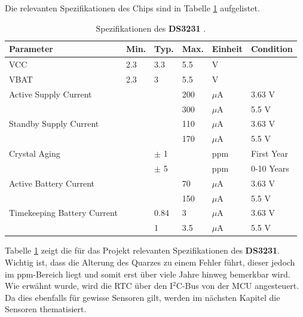 \newpage
Die relevanten Spezifikationen des Chips sind in Tabelle \ref{tab:DS3231} aufgelistet.\\

\begin{table}[h]
\begin{tabular}{llllll}
\hline 
\textbf{Parameter} & \textbf{Min.} & \textbf{Typ.} & \textbf{Max.} & \textbf{Einheit} & \textbf{Condition} \\ 
\hline 
VCC & 2.3 & 3.3 & 5.5 & V &  \\ 
VBAT & 2.3 & 3 & 5.5 & V &  \\ 
Active Supply Current &  &  & 200 & $\mu$A & 3.63 V \\ 
 &  &  & 300 & $\mu$A & 5.5 V \\ 
Standby Supply Current &  & & 110 & $\mu$A & 3.63 V \\ 
 &  &  & 170 & $\mu$A & 5.5 V \\ 
Crystal Aging &  & $\pm$ 1 &  & ppm & First Year \\ 
 &  & $\pm$ 5 &  & ppm & 0-10 Years \\ 
Active Battery Current &  &  & 70 & $\mu$A & 3.63 V \\ 
 &  &  & 150 & $\mu$A & 5.5 V \\ 
Timekeeping Battery Current &  & 0.84 & 3 & $\mu$A & 3.63 V \\ 
 &  & 1 & 3.5 & $\mu$A & 5.5 V \\ 
\hline 
\end{tabular} 
\caption{Spezifikationen des \textbf{DS3231} \cite{DS3231DS}.}
\label{tab:DS3231}
\end{table}

Tabelle \ref{tab:DS3231} zeigt die für das Projekt relevanten Spezifikationen des \textbf{DS3231}. Wichtig ist, dass die Alterung des Quarzes zu einem Fehler führt, dieser jedoch im ppm-Bereich liegt und somit erst über viele Jahre hinweg bemerkbar wird.\\[0.5cm]
Wie erwähnt wurde, wird die RTC über den I$^2$C-Bus von der MCU angesteuert. Da dies ebenfalls für gewisse Sensoren gilt, werden im nächsten Kapitel die Sensoren thematisiert.

